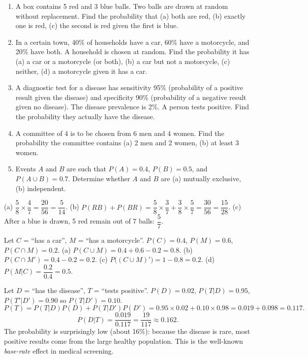 \documentclass[11pt]{article}
\begin{document}
\begin{exercice}
\begin{enumerate}
    \item A box contains 5 red and 3 blue balls. Two balls are drawn at random without replacement. Find the probability that (a) both are red, (b) exactly one is red, (c) the second is red given the first is blue.
    \item In a certain town, 40\% of households have a car, 60\% have a motorcycle, and 20\% have both. A household is chosen at random. Find the probability it has (a) a car or a motorcycle (or both), (b) a car but not a motorcycle, (c) neither, (d) a motorcycle given it has a car.
    \item A diagnostic test for a disease has sensitivity 95\% (probability of a positive result given the disease) and specificity 90\% (probability of a negative result given no disease). The disease prevalence is 2\%. A person tests positive. Find the probability they actually have the disease.
    \item A committee of 4 is to be chosen from 6 men and 4 women. Find the probability the committee contains (a) 2 men and 2 women, (b) at least 3 women.
    \item Events $A$ and $B$ are such that $P(A)=0.4$, $P(B)=0.5$, and $P(A \cup B)=0.7$. Determine whether $A$ and $B$ are (a) mutually exclusive, (b) independent.
\end{enumerate}
\end{exercice}

\begin{corrige}[Exercise 1]
(a) $\dfrac{5}{8} \times \dfrac{4}{7} = \dfrac{20}{56} = \dfrac{5}{14}$. \quad (b) $P(RB) + P(BR) = \dfrac{5}{8}\times\dfrac{3}{7} + \dfrac{3}{8}\times\dfrac{5}{7} = \dfrac{30}{56} = \dfrac{15}{28}$. \quad (c) After a blue is drawn, 5 red remain out of 7 balls: $\dfrac{5}{7}$.
\end{corrige}

\begin{corrige}[Exercise 2]
Let $C$ = ``has a car'', $M$ = ``has a motorcycle''. $P(C)=0.4$, $P(M)=0.6$, $P(C \cap M)=0.2$.
(a) $P(C \cup M) = 0.4+0.6-0.2 = 0.8$. \quad (b) $P(C \cap M') = 0.4-0.2 = 0.2$. \quad (c) $P\bigl((C \cup M)'\bigr) = 1-0.8 = 0.2$. \quad (d) $P(M|C) = \dfrac{0.2}{0.4} = 0.5$.
\end{corrige}

\begin{corrige}[Exercise 3]
Let $D$ = ``has the disease'', $T$ = ``tests positive''. $P(D)=0.02$, $P(T|D)=0.95$, $P(T'|D')=0.90$ so $P(T|D')=0.10$.
\[
P(T) = P(T|D)P(D) + P(T|D')P(D') = 0.95\times 0.02 + 0.10\times 0.98 = 0.019 + 0.098 = 0.117.
\]
\[
P(D|T) = \frac{0.019}{0.117} = \frac{19}{117} \approx 0.162.
\]
The probability is surprisingly low (about 16\%): because the disease is rare, most positive results come from the large healthy population. This is the well-known \emph{base-rate} effect in medical screening.
\end{corrige}
\end{document}

